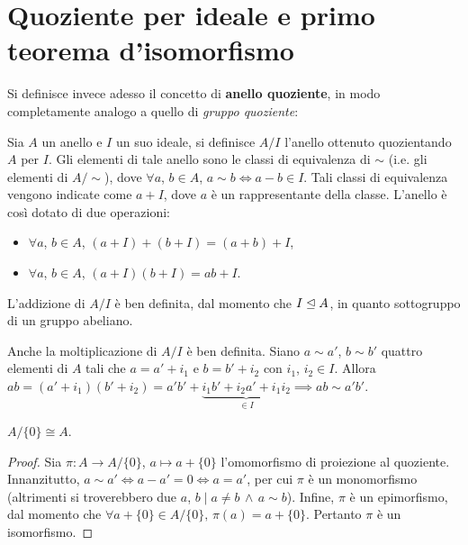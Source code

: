 \documentclass[11pt]{scrbook}
\begin{document}
\section{Quoziente per ideale e primo teorema d'isomorfismo}

Si definisce invece adesso il concetto di \textbf{anello quoziente}, in modo
completamente analogo a quello di \textit{gruppo quoziente}:

\begin{definition}
    Sia $A$ un anello e $I$ un suo ideale, si definisce $A/I$ l'anello ottenuto
    quozientando $A$ per $I$. Gli elementi di tale anello sono le classi di equivalenza di $\sim$ (i.e. gli elementi di $A/{\sim}$), dove $\forall a$, $b \in A$, $a\sim b \iff a-b \in I$. Tali classi di equivalenza vengono indicate come
    $a + I$, dove $a$ è un rappresentante della classe. L'anello è così dotato di due operazioni:

    \begin{itemize}
        \item $\forall a$, $b \in A$, $(a+I)+(b+I)=(a+b)+I$,
        \item $\forall a$, $b \in A$, $(a+I)(b+I)=ab+I$.
    \end{itemize}
\end{definition}

\begin{remark*}
    L'addizione di $A/I$ è ben definita, dal momento che $I \mathrel{\unlhd} A$, in quanto sottogruppo di un gruppo abeliano.
\end{remark*}

\begin{remark*}
    Anche la moltiplicazione di $A/I$ è ben definita. Siano $a\sim a'$, $b \sim b'$ quattro elementi di $A$ tali che $a = a' + i_1$ e $b = b' + i_2$ con $i_1$, $i_2 \in I$. Allora $ab=(a'+i_1)(b'+i_2)=a'b' + \underbrace{i_1b' + i_2a' + i_1i_2}_{\in I} \implies ab \sim a'b'$.
\end{remark*}

\begin{proposition}
    \label{prop:quoziente_pieno}
    $A/\{0\} \cong A$.
\end{proposition}

\begin{proof}
    Sia $\pi : A \to A/\{0\}$, $a \mapsto a + \{0\}$ l'omomorfismo di proiezione
    al quoziente. Innanzitutto, $a \sim a' \iff a-a'=0 \iff a=a'$, per cui $\pi$ è
    un monomorfismo (altrimenti si troverebbero due $a$, $b \mid a \neq b \,\land\, a \sim b$). Infine, $\pi$ è un epimorfismo, dal momento che $\forall a + \{0\} \in A/\{0\}, \, \pi(a) = a + \{0\}$. Pertanto $\pi$ è un isomorfismo.
\end{proof}
\end{document}
